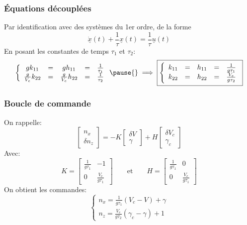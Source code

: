 \documentclass[footheight=2em]{beamer}
\begin{document}
\begin{frame}
    \frametitle{Équations découplées} \pause{}
    Par identification avec des systèmes du 1er ordre, de la forme
    \[ \underline{\dot{x}}(t) + \frac{1}{\tau}\underline{x}(t)= \frac{1}{\tau}\underline{u}(t)\]
    \pause{}
    En posant les constantes de temps \( \tau_1\) et \( \tau_2\):
    \[
    \left \{
    \begin{array}{ccccc}
        g k_{11} &=& g h_{11} &=& \frac{1}{\tau_1} \\
        \frac{g}{V_e} k_{22} &=& \frac{g}{V_e} h_{22} &=& \frac{1}{\tau_2}
    \end{array}
    \right. \pause{}
    \implies{}
    \boxed{
        \left \{
        \begin{array}{ccccc}
            k_{11} &=& h_{11} &=& \frac{1}{g \tau_1} \\
            k_{22} &=& h_{22} &=& \frac{V_e}{g \tau_2}
        \end{array}
        \right.
    }
    \]
\end{frame}

\begin{frame}
    \frametitle{Boucle de commande} \pause{}
    On rappelle:
    \[
    \left[
    \begin{array}{c}
        n_x \\
        \delta n_z
    \end{array}
    \right]
    =
    -K
    \left[
    \begin{array}{c}
        \delta V \\
        \gamma
    \end{array}
    \right]
    +H
    \left[
    \begin{array}{c}
        \delta V_c \\
        \gamma_c
    \end{array}
    \right]
    \] \pause{}
    Avec:
    \[
    K=
    \left[
    \begin{array}{cc}
        \frac{1}{g\tau_1} & -1 \\
        0 & \frac{V_e}{g\tau_1}
    \end{array}
    \right]
    \qquad
    \text{et}
    \qquad
    H=
    \left[
    \begin{array}{cc}
        \frac{1}{g\tau_1} & 0 \\
        0 & \frac{V_e}{g\tau_1}
    \end{array}
    \right]
    \] \pause{}
    On obtient les commandes:
    \[
    \boxed{
    \left \{
        \begin{array}{l}
            n_x =  \frac{1}{g\tau_1} (V_c - V) + \gamma \\
            n_z =  \frac{V_e}{g\tau_2} (\gamma_c - \gamma) + 1
        \end{array}
        \right.
    }
    \]
\end{frame}
\end{document}
